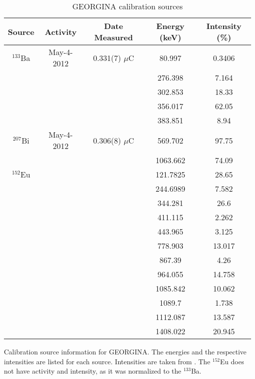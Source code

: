 \begin{table}[]
    \centering
    \caption{GEORGINA calibration sources}
    \begin{tabular}{c|c|c|c|c} \toprule
         Source & Activity & Date Measured & Energy (keV) & Intensity (\%)\\
          \hline 
         $^{133}$Ba & May-4-2012 & 0.331(7) $\mu$C & 80.997 & 0.3406 \\
         & & & 276.398 & 7.164 \\
         & & & 302.853 & 18.33 \\
         & & & 356.017 & 62.05 \\
         & & & 383.851 & 8.94 \\
         \hline
         $^{207}$Bi & May-4-2012 & 0.306(8) $\mu$C & 569.702 & 97.75 \\ 
         & & & 1063.662 & 74.09 \\
         \hline
         $^{152}$Eu & & & 121.7825 & 28.65 \\
         & & & 244.6989 & 7.582 \\
         & & & 344.281 & 26.6 \\
         & & & 411.115 & 2.262 \\
         & & & 443.965 & 3.125 \\
         & & & 778.903 & 13.017 \\
         & & & 867.39 & 4.26 \\
         & & & 964.055 & 14.758 \\
         & & & 1085.842 & 10.062 \\
         & & & 1089.7 & 1.738 \\
         & & & 1112.087 & 13.587 \\
         & & & 1408.022 & 20.945 \\\bottomrule
    \end{tabular}
    \footnotesize
    \item Calibration source information for GEORGINA. The energies and the respective intensities are listed for each source. Intensities are taken from \cite{trzaska90:_calibration}. The  $^{152}$Eu does not have activity and intensity, as it was normalized to the $^{133}$Ba.
    \label{tab:GEORGINA_Cal_Source}
\end{table}